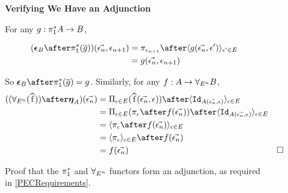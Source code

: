 \begin{figure}
    \begin{framed}
        \centering
        \textbf{Verifying We Have an Adjunction}

        \centering
        For any $g: \pi_1^* A \rightarrow B$,
        
        \begin{align*}
            (\counit{B}\after\pstar(\bar{g}))(\env, \e_{n+1}) & = \pi_{\e_{n+1}}\after\finpr{g(\env, \e')}{\e'\in E}\\
            &= g(\env, \e_{n+1})
        \end{align*}
        
        \centering
        So $\counit{B}\after\pstar(\bar{g}) = g$.   Similarly, for any $f: A \rightarrow \forall_{E^n} B$,
        \begin{align*}
            ((\allEn(\widehat{f}))\after\unit{A})(\env) & = \Pi_{\e\in E}(\widehat{f}(\env, \e))\after \finpr{\Id{A(\env, \e)}}{\e\in E}\\
            & = \Pi_{\e\in E}(\pi_\e\after f(\env))\after \finpr{\Id{A(\env, \e)}}{\e\in E}\\
            & =  \finpr{\pi_\e\after f(\env)}{\e\in E}\\
            & = \finpr{\pi_\e}{\e\in E}\after f(\env)\\
            & = f(\env)&\square
        \end{align*}
    \end{framed}
    \caption{Proof that the $\pi_1^*$ and $\forall_{E^n}$ functors form an adjunction, as required in \ref{PECRequirements}.}
    \label{AdjunctionProof}
\end{figure}




